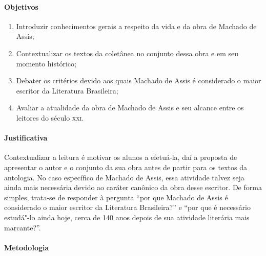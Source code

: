 \documentclass{extarticle}
\begin{document}
\paragraph{Objetivos}

\begin{enumerate}
\item Introduzir conhecimentos gerais a respeito da
vida e da obra de Machado de Assis; 
\item Contextualizar os textos da
coletânea no conjunto dessa obra e em seu momento histórico; 
\item Debater
os critérios devido aos quais Machado de Assis é considerado o maior
escritor da Literatura Brasileira; 
\item Avaliar a atualidade da obra de
Machado de Assis e seu alcance entre os leitores do século \textsc{xxi}.
\end{enumerate}

\paragraph{Justificativa} Contextualizar a leitura é motivar os alunos a
efetuá-la, daí a proposta de apresentar o autor e o conjunto da sua obra
antes de partir para os textos da antologia. No caso específico de
Machado de Assis, essa atividade talvez seja ainda mais necessária
devido ao caráter canônico da obra desse escritor. De forma simples,
trata-se de responder à pergunta ``por que Machado de Assis é
considerado o maior escritor da Literatura Brasileira?'' e ``por que é
necessário estudá"-lo ainda hoje, cerca de 140 anos depois de sua
atividade literária mais marcante?''.

\paragraph{Metodologia}
\end{document}
